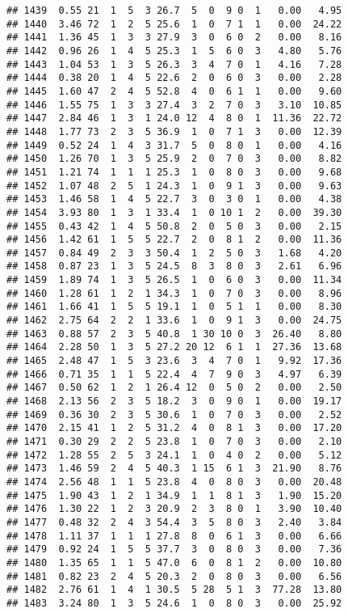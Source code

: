 \documentclass[
]{article}
\begin{document}
\begin{verbatim}
## 1439  0.55 21  1  5  3 26.7  5  0  9 0  1   0.00   4.95
## 1440  3.46 72  1  2  5 25.6  1  0  7 1  1   0.00  24.22
## 1441  1.36 45  1  3  3 27.9  3  0  6 0  2   0.00   8.16
## 1442  0.96 26  1  4  5 25.3  1  5  6 0  3   4.80   5.76
## 1443  1.04 53  1  3  5 26.3  3  4  7 0  1   4.16   7.28
## 1444  0.38 20  1  4  5 22.6  2  0  6 0  3   0.00   2.28
## 1445  1.60 47  2  4  5 52.8  4  0  6 1  1   0.00   9.60
## 1446  1.55 75  1  3  3 27.4  3  2  7 0  3   3.10  10.85
## 1447  2.84 46  1  3  1 24.0 12  4  8 0  1  11.36  22.72
## 1448  1.77 73  2  3  5 36.9  1  0  7 1  3   0.00  12.39
## 1449  0.52 24  1  4  3 31.7  5  0  8 0  1   0.00   4.16
## 1450  1.26 70  1  3  5 25.9  2  0  7 0  3   0.00   8.82
## 1451  1.21 74  1  1  1 25.3  1  0  8 0  3   0.00   9.68
## 1452  1.07 48  2  5  1 24.3  1  0  9 1  3   0.00   9.63
## 1453  1.46 58  1  4  5 22.7  3  0  3 0  1   0.00   4.38
## 1454  3.93 80  1  3  1 33.4  1  0 10 1  2   0.00  39.30
## 1455  0.43 42  1  4  5 50.8  2  0  5 0  3   0.00   2.15
## 1456  1.42 61  1  5  5 22.7  2  0  8 1  2   0.00  11.36
## 1457  0.84 49  2  3  3 50.4  1  2  5 0  3   1.68   4.20
## 1458  0.87 23  1  3  5 24.5  8  3  8 0  3   2.61   6.96
## 1459  1.89 74  1  3  5 26.5  1  0  6 0  3   0.00  11.34
## 1460  1.28 61  1  2  1 34.3  1  0  7 0  3   0.00   8.96
## 1461  1.66 41  1  5  5 19.1  1  0  5 1  1   0.00   8.30
## 1462  2.75 64  2  2  1 33.6  1  0  9 1  3   0.00  24.75
## 1463  0.88 57  2  3  5 40.8  1 30 10 0  3  26.40   8.80
## 1464  2.28 50  1  3  5 27.2 20 12  6 1  1  27.36  13.68
## 1465  2.48 47  1  5  3 23.6  3  4  7 0  1   9.92  17.36
## 1466  0.71 35  1  1  5 22.4  4  7  9 0  3   4.97   6.39
## 1467  0.50 62  1  2  1 26.4 12  0  5 0  2   0.00   2.50
## 1468  2.13 56  2  3  5 18.2  3  0  9 0  1   0.00  19.17
## 1469  0.36 30  2  3  5 30.6  1  0  7 0  3   0.00   2.52
## 1470  2.15 41  1  2  5 31.2  4  0  8 1  3   0.00  17.20
## 1471  0.30 29  2  2  5 23.8  1  0  7 0  3   0.00   2.10
## 1472  1.28 55  2  5  3 24.1  1  0  4 0  2   0.00   5.12
## 1473  1.46 59  2  4  5 40.3  1 15  6 1  3  21.90   8.76
## 1474  2.56 48  1  1  5 23.8  4  0  8 0  3   0.00  20.48
## 1475  1.90 43  1  2  1 34.9  1  1  8 1  3   1.90  15.20
## 1476  1.30 22  1  2  3 20.9  2  3  8 0  1   3.90  10.40
## 1477  0.48 32  2  4  3 54.4  3  5  8 0  3   2.40   3.84
## 1478  1.11 37  1  1  1 27.8  8  0  6 1  3   0.00   6.66
## 1479  0.92 24  1  5  5 37.7  3  0  8 0  3   0.00   7.36
## 1480  1.35 65  1  1  5 47.0  6  0  8 1  2   0.00  10.80
## 1481  0.82 23  2  4  5 20.3  2  0  8 0  3   0.00   6.56
## 1482  2.76 61  1  4  1 30.5  5 28  5 1  3  77.28  13.80
## 1483  3.24 80  1  3  5 24.6  1  0  8 0  3   0.00  25.92

\end{verbatim}
\end{document}
